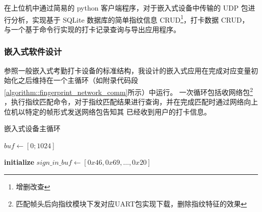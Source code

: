     在上位机中通过简易的 python 客户端程序，对于嵌入式设备中传输的 UDP 包进行分析，实现基于 SQLite 数据库的简单指纹信息 CRUD\footnote{增删改查}，打卡数据 CRUD，
    与一个基于命令行实现的打卡记录查询与导出应用程序。

    \subsubsection{嵌入式软件设计}

    参照一般嵌入式考勤打卡设备的标准结构，我设计的嵌入式应用在完成对应变量初始化之后维持在一个主循环（如附录代码段\ref{algorithm::fingerprint_network_comm}所示）中运行。
    一次循环包括收网络包\footnote{匹配帧头后向指纹模块下发对应UART包实现下载，删除指纹特征的效果}
    ，执行指纹匹配命令，对于指纹匹配结果进行查询，并在完成匹配时通过网络向上位机以特定的帧形式发送网络包告知其
    已经收到用户的打卡信息。

    \begin{algorithm}[htb]
        \caption{嵌入式设备主循环}
        \label{algorithm::fingerprint_network_comm}
        \begin{algorithmic}[1]
         
             
                    \State {} 
                \EndIf
                \State $buf \gets [0; 1024]$ 
            \EndIf
        
            \State {} 

            \State {} 
            \State {} 
            
            \State {} 
        
              
                \State {} 
                
                    \State \textbf{initialize} $sign\_in\_buf \gets [0x46, 0x69, \ldots, 0x20]$ 
                    \State {} 
                    \State {}
                    \State {} 
                \EndIf
                \State {}
            \EndIf
        \EndWhile
        \end{algorithmic}
        \end{algorithm}
        

